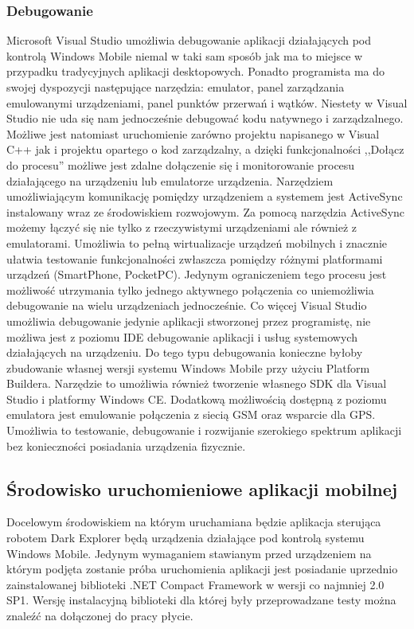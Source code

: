 \subsubsection{Debugowanie}
Microsoft Visual Studio umożliwia debugowanie aplikacji działających pod kontrolą
Windows Mobile niemal w taki sam sposób jak ma to miejsce w przypadku
tradycyjnych aplikacji desktopowych. Ponadto programista ma do swojej dyspozycji
następujące narzędzia: emulator, panel zarządzania emulowanymi urządzeniami,
panel punktów przerwań i wątków. Niestety w Visual Studio nie uda się nam
jednocześnie debugować kodu natywnego i zarządzalnego. Możliwe jest natomiast
uruchomienie zarówno projektu napisanego w Visual C++ jak i projektu opartego o
kod zarządzalny, a dzięki funkcjonalności ,,Dołącz do procesu'' możliwe jest
zdalne dołączenie się i monitorowanie procesu działającego na urządzeniu lub
emulatorze urządzenia. Narzędziem umożliwiającym komunikację pomiędzy urządzeniem
a systemem jest ActiveSync instalowany wraz ze środowiskiem rozwojowym. Za pomocą
narzędzia ActiveSync możemy łączyć się nie tylko z rzeczywistymi urządzeniami ale
również z emulatorami. Umożliwia to pełną wirtualizacje urządzeń mobilnych i
znacznie ułatwia testowanie funkcjonalności zwłaszcza pomiędzy różnymi
platformami urządzeń (SmartPhone, PocketPC). Jedynym ograniczeniem tego procesu
jest możliwość utrzymania tylko jednego aktywnego połączenia co uniemożliwia
debugowanie na wielu urządzeniach jednocześnie. Co więcej Visual Studio umożliwia
debugowanie jedynie aplikacji stworzonej przez programistę, nie możliwa jest z
poziomu IDE debugowanie aplikacji i usług systemowych działających na urządzeniu.
Do tego typu debugowania konieczne byłoby zbudowanie własnej wersji systemu
Windows Mobile przy użyciu Platform Buildera. Narzędzie to umożliwia również
tworzenie własnego SDK dla Visual Studio i platformy Windows CE. Dodatkową
możliwością dostępną z poziomu emulatora jest emulowanie połączenia z siecią GSM
oraz wsparcie dla GPS. Umożliwia to testowanie, debugowanie i rozwijanie
szerokiego spektrum aplikacji bez konieczności posiadania urządzenia fizycznie.

\subsection{Środowisko uruchomieniowe aplikacji mobilnej}
Docelowym środowiskiem na którym uruchamiana będzie aplikacja sterująca robotem
Dark Explorer będą urządzenia działające pod kontrolą systemu Windows Mobile.
Jedynym wymaganiem stawianym przed urządzeniem na którym podjęta zostanie próba
uruchomienia aplikacji jest posiadanie uprzednio zainstalowanej biblioteki .NET
Compact Framework w wersji co najmniej 2.0 SP1. Wersję instalacyjną biblioteki
dla której były przeprowadzane testy można znaleźć na dołączonej do pracy
płycie. 

